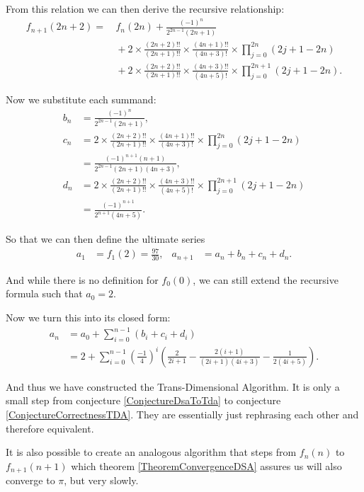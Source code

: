 \documentclass[a4paper,11pt]{scrartcl}
\theoremstyle{definition}
\theoremstyle{plain}
\theoremstyle{remark}
\begin{document}
From this relation we can then derive the recursive relationship:
\begin{align*}
f_{n+1}(2n + 2) =&\, f_n(2n) + \frac{(-1)^n}{2^{2n-1}(2n+1)} \\
&\,+ 2 \times \frac{(2n+2)!!}{(2n+1)!!} \times \frac{(4n+1)!!}{(4n+3)!} \times \prod_{j=0}^{2n}(2j+1-2n) \\
&\,+ 2 \times \frac{(2n+2)!!}{(2n+1)!!} \times \frac{(4n+3)!!}{(4n+5)!} \times \prod_{j=0}^{2n+1}(2j+1-2n).
\end{align*}

Now we substitute each summand:
\begin{align*}
b_n &= \frac{(-1)^{n}}{2^{2n-1}(2n+1)}, \\
c_n &=  2 \times \frac{(2n+2)!!}{(2n+1)!!} \times \frac{(4n+1)!!}{(4n+3)!} \times \prod_{j=0}^{2n}(2j+1-2n) \\
&= \frac{(-1)^{n+1}(n+1)}{2^{2n-1}(2n+1)(4n+3)}, \\
d_n &= 2 \times \frac{(2n+2)!!}{(2n+1)!!} \times \frac{(4n+3)!!}{(4n+5)!} \times \prod_{j=0}^{2n+1}(2j+1-2n) \\
&= \frac{(-1)^{n+1}}{2^{n+1}(4n+5)}.
\end{align*}

So that we can then define the ultimate series
\begin{align*}
a_1 &= f_1(2) = \frac{97}{30}, & a_{n+1} &= a_n + b_n + c_n + d_n.
\end{align*}

And while there is no definition for $f_0(0)$, we can still extend the recursive formula such that $a_0 = 2$.

Now we turn this into its closed form:
\begin{align*}
a_n &= a_0 + \sum_{i=0}^{n-1}(b_i + c_i + d_i) \\
&= 2 + \sum_{i=0}^{n-1} \left(\frac{-1}{4}\right)^i
\left(\frac{2}{2i+1} - \frac{2(i+1)}{(2i+1)(4i+3)} - \frac{1}{2(4i+5)}\right).
\end{align*}

And thus we have constructed the Trans-Dimensional Algorithm.
It is only a small step from conjecture \ref{ConjectureDsaToTda} to conjecture \ref{ConjectureCorrectnessTDA}.
They are essentially just rephrasing each other and therefore equivalent.

It is also possible to create an analogous algorithm that steps from $f_n(n)$ to $f_{n+1}(n+1)$ which theorem \ref{TheoremConvergenceDSA} assures us will also converge to $\pi$, but very slowly.
\end{document}
